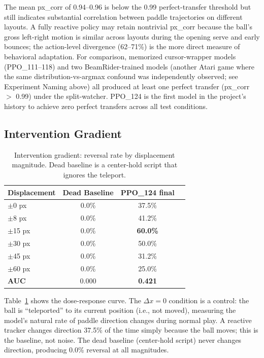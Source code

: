 \documentclass[11pt]{article}
\begin{document}
The mean px\_corr of 0.94--0.96 is below the 0.99 perfect-transfer threshold
but still indicates substantial correlation between paddle trajectories on
different layouts. A fully reactive policy may retain nontrivial px\_corr
because the ball's gross left-right motion is similar across layouts during the
opening serve and early bounces; the action-level divergence (62--71\%) is the
more direct measure of behavioral adaptation. For comparison, memorized cursor-wrapper
models (PPO\_111--118) and two BeamRider-trained models (another Atari game
where the same distribution-vs-argmax confound was independently observed;
see Experiment Naming above) all produced at least one perfect transfer (px\_corr
$>$ 0.99) under the split-watcher. PPO\_124 is the first model in the
project's history to achieve zero perfect transfers across all test
conditions.

\subsection{Intervention Gradient}

\begin{table}[h]
\centering
\begin{tabular}{lccc}
\toprule
\textbf{Displacement} & \textbf{Dead Baseline} & \textbf{PPO\_124 final} \\
\midrule
$\pm$0 px   & 0.0\% & 37.5\% \\
$\pm$8 px   & 0.0\% & 41.2\% \\
$\pm$15 px  & 0.0\% & \textbf{60.0\%} \\
$\pm$30 px  & 0.0\% & 50.0\% \\
$\pm$45 px  & 0.0\% & 31.2\% \\
$\pm$60 px  & 0.0\% & 25.0\% \\
\midrule
\textbf{AUC} & 0.000 & \textbf{0.421} \\
\bottomrule
\end{tabular}
\caption{Intervention gradient: reversal rate by displacement magnitude.
Dead baseline is a center-hold script that ignores the teleport.}
\label{tab:intervention}
\end{table}

Table~\ref{tab:intervention} shows the dose-response curve. The $\Delta x=0$
condition is a control: the ball is ``teleported'' to its current position
(i.e., not moved), measuring the model's natural rate of paddle direction
changes during normal play. A reactive tracker changes direction 37.5\% of the
time simply because the ball moves; this is the baseline, not noise. The dead
baseline (center-hold script) never changes direction, producing 0.0\%
reversal at all magnitudes.
\end{document}
